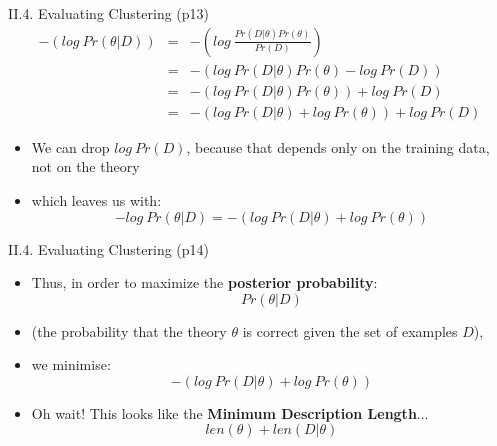 \documentclass[handout]{beamer}
\newcommand{\stronger}[1]{\textbf{\color{purple} #1}}
\begin{document}
\begin{frame}{II.4. Evaluating Clustering (p13)}
\begin{eqnarray*}
-(log ~ Pr(\theta|D))& = & -(log ~ \frac{ Pr(D|\theta)Pr(\theta) }{ Pr(D) }) \\
& = & -(log ~ Pr(D|\theta)Pr(\theta) - log ~ Pr(D))\\
& = & -(log ~ Pr(D|\theta)Pr(\theta)) + log ~ Pr(D)\\
& = & -(log ~ Pr(D|\theta) + log ~ Pr(\theta)) + log ~ Pr(D)
\end{eqnarray*}
\begin{itemize}
\item We can drop $log ~ Pr(D)$, because that depends only on the training data, not on the theory
\item[] which leaves us with:
\[
- log ~ Pr(\theta|D) = - (log ~ Pr(D|\theta) + log ~ Pr(\theta))
\]
\end{itemize}
\end{frame}
\begin{frame}{II.4. Evaluating Clustering (p14)}
\begin{itemize}
\item Thus, in order to maximize the \stronger{posterior probability}:
\[
	Pr(\theta|D)
\]
\item[] (the probability that the theory $\theta$ is correct given the set of examples $D$),
\item[] we minimise:
\[
	- (log ~ Pr(D|\theta) + log ~ Pr(\theta))
\]
\item Oh wait! This looks like the \stronger{Minimum Description Length}...
\[
len(\theta) + len(D|\theta)
\]
\end{itemize}
\end{frame}




\end{document}
